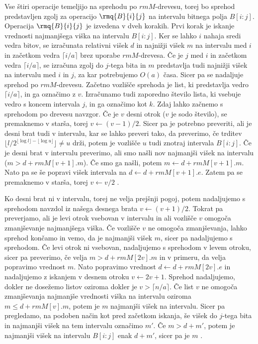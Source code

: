 Vse štiri operacije temeljijo na sprehodu po $rmM$-drevesu, torej bo sprehod predstavljen zgolj za operacijo $\rmq{B}{i}{j}$ na intervalu bitnega polja $B[i:j]$. Operacija $\rmq{B}{i}{j}$ je izvedena v dveh korakih. Prvi korak je iskanje vrednosti najmanjšega viška na intervalu $B[i:j]$. Ker se lahko $i$ nahaja sredi vedra bitov, se izračunata relativni višek $d$ in najnižji višek $m$ na intervalu med $i$ in začetkom vedra $\lceil i/a\rceil$ brez uporabe $rmM$-drevesa. Če je $j$ med $i$ in začetkom vedra $\lceil i/a\rceil$, se izračuna zgolj do $j$-tega bita in $m$ predstavlja tudi najnižji višek na intervalu med $i$ in $j$, za kar potrebujemo $O(a)$ časa. Sicer pa se nadaljuje sprehod po $rmM$-drevesu. Začetno vozlišče sprehoda je list, ki predstavlja vedro $\lceil i/a\rceil$, in ga označimo z $v$. Izračunamo tudi zaporedno število lista, ki vsebuje vedro s koncem intervala $j$, in ga označimo kot $k$. Zdaj lahko začnemo s sprehodom po drevesu navzgor. Če je $v$ desni otrok ($v$ je sodo število), se premaknemo v starša, torej $v\leftarrow (v-1)/2$. Sicer pa je potrebno preveriti, ali je desni brat tudi v intervalu, kar se lahko preveri tako, da preverimo, če trditev $\lfloor l/2^{\lfloor \log l\rfloor- \lfloor \log u \rfloor}\rfloor\ne u$ drži, potem je vozlišče $u$ tudi znotraj intervala $B[i:j]$. Če je desni brat v intervalu preverimo, ali smo našli nov najmanjši višek na intervalu ($m>d+rmM[v+1].m$). Če smo ga našli, potem $m\leftarrow d+rmM[v+1].m$. Nato pa se še popravi višek intervala na $d\leftarrow d+rmM[v+1].e$. Zatem pa se premaknemo v starša, torej $v\leftarrow v/2$ \cite{Navarro2016}.

Ko desni brat ni v intervalu, torej ne velja prejšnji pogoj, potem nadaljujemo s sprehodom navzdol iz našega desnega brata $v\leftarrow (v+1)/2$. Tokrat pa preverjamo, ali je levi otrok vsebovan v intervalu in ali vozlišče $v$ omogoča zmanjševanje najmanjšega viška. Če vozlišče $v$ ne omogoča zmanjševanja, lahko sprehod končamo in vemo, da je najmanjši višek $m$, sicer pa nadaljujemo s sprehodom. Če levi otrok ni vsebovan, nadaljujemo s sprehodom v levem otroku, sicer pa preverimo, če velja $m>d+rmM[2v].m$ in v primeru, da velja popravimo vrednost $m$. Nato popravimo vrednost $d\leftarrow d+rmM[2v].e$ in nadaljujemo z iskanjem v desnem otroku $v\leftarrow 2v+1$. Sprehod nadaljujemo, dokler ne dosežemo listov oziroma dokler je $v>\lceil n/a\rceil$. Če list $v$ ne omogoča zmanjševanja najmanjše vrednosti viška na intervalu oziroma $m\le d+rmM[v].m$, potem je $m$ najmanjši višek na intervalu. Sicer pa pregledamo, na podoben način kot pred začetkom iskanja, še višek do $j$-tega bita in najmanjši višek na tem intervalu označimo $m'$. Če $m>d+m'$, potem je najmanjši višek na intervalu $B[i:j]$ enak $d+m'$, sicer pa je $m$ \cite{Navarro2016}.

